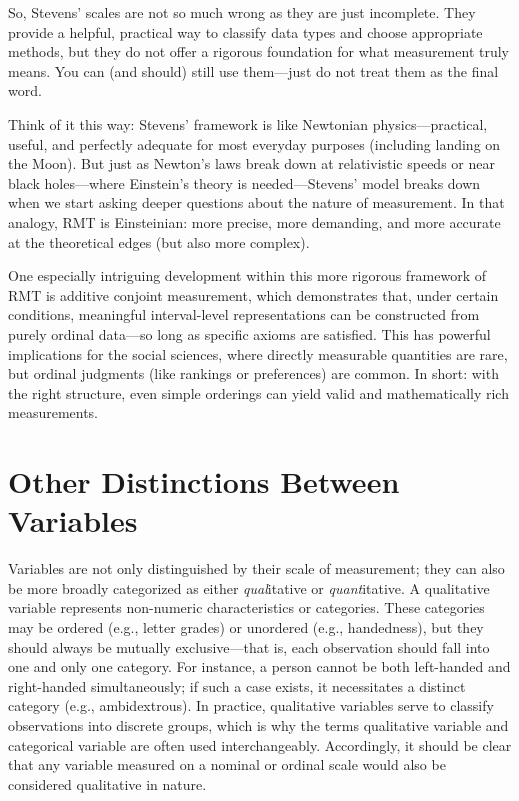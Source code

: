 So, Stevens’ scales are not so much wrong as they are just incomplete. They provide a helpful, practical way to classify data types and choose appropriate methods, but they do not offer a rigorous foundation for what measurement truly means. You can (and should) still use them—just do not treat them as the final word.

Think of it this way: Stevens’ framework is like Newtonian physics—practical, useful, and perfectly adequate for most everyday purposes (including landing on the Moon). But just as Newton’s laws break down at relativistic speeds or near black holes—where Einstein’s theory is needed—Stevens’ model breaks down when we start asking deeper questions about the nature of measurement. In that analogy, RMT is Einsteinian: more precise, more demanding, and more accurate at the theoretical edges (but also more complex).

One especially intriguing development within this more rigorous framework of RMT is additive conjoint measurement, which demonstrates that, under certain conditions, meaningful interval-level representations can be constructed from purely ordinal data—so long as specific axioms are satisfied. This has powerful implications for the social sciences, where directly measurable quantities are rare, but ordinal judgments (like rankings or preferences) are common. In short: with the right structure, even simple orderings can yield valid and mathematically rich measurements.

\section{Other Distinctions Between Variables}

Variables are not only distinguished by their scale of measurement; they can also be more broadly categorized as either \textit{qual}itative or \textit{quant}itative. A \gls{qualitative variable} represents non-numeric characteristics or categories. These categories may be ordered (e.g., letter grades) or unordered (e.g., handedness), but they should always be mutually exclusive—that is, each observation should fall into one and only one category. For instance, a person cannot be both left-handed and right-handed simultaneously; if such a case exists, it necessitates a distinct category (e.g., ambidextrous). In practice, qualitative variables serve to classify observations into discrete groups, which is why the terms qualitative variable and categorical variable are often used interchangeably. Accordingly, it should be clear that any variable measured on a nominal or ordinal scale would also be considered qualitative in nature.\label{sec:qual_var}

